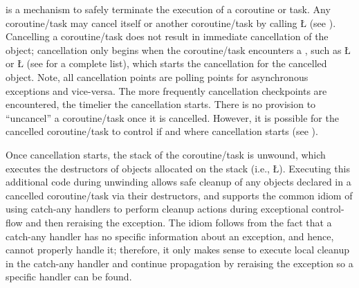 \documentclass[openright,twoside]{report}
\begin{document}
 is a mechanism to safely terminate the execution of a coroutine or task.
Any coroutine/task may cancel itself or another coroutine/task by calling \LGinlinetrue\LGbegin\lgrinde\L{}\endlgrinde\LGend{} (see ).
Cancelling a coroutine/task does not result in immediate cancellation of the object;
cancellation only begins when the coroutine/task encounters a , such as \LGinlinetrue\LGbegin\lgrinde\L{}\endlgrinde\LGend{} or \LGinlinetrue\LGbegin\lgrinde\L{}\endlgrinde\LGend{} (see  for a complete list), which starts the cancellation for the cancelled object.
Note, all cancellation points are polling points for asynchronous exceptions and vice-versa.
The more frequently cancellation checkpoints are encountered, the timelier the cancellation starts.
There is no provision to ``uncancel'' a coroutine/task once it is cancelled.
However, it is possible for the cancelled coroutine/task to control if and where cancellation starts (see ).

Once cancellation starts, the stack of the coroutine/task is unwound, which executes the destructors of objects allocated on the stack  (i.e., \LGinlinetrue\LGbegin\lgrinde\L{}\endlgrinde\LGend{}).
Executing this additional code during unwinding allows safe cleanup of any objects declared in a cancelled coroutine/task via their destructors, and supports the common \CC idiom of using catch-any handlers to perform cleanup actions during exceptional control-flow and then reraising the exception.
The \CC idiom follows from the fact that a catch-any handler has no specific information about an exception, and hence, cannot properly handle it;
therefore, it only makes sense to execute local cleanup in the catch-any handler and continue propagation by reraising the exception so a specific handler can be found.
\end{document}
